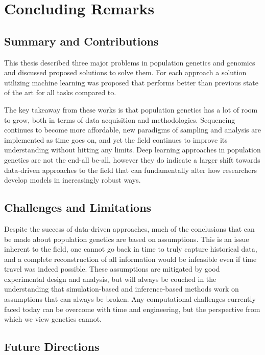 \chapter{Concluding Remarks}

\section{Summary and Contributions}

This thesis described three major problems in population genetics and genomics and discussed proposed solutions to solve them. For each approach a solution utilizing machine learning was proposed that performs better than previous state of the art for all tasks compared to.

The key takeaway from these works is that population genetics has a lot of room to grow, both in terms of data acquisition and methodologies. Sequencing continues to become more affordable, new paradigms of sampling and analysis are implemented as time goes on, and yet the field continues to improve its understanding without hitting any limits. Deep learning approaches in population genetics are not the end-all be-all, however they do indicate a larger shift towards data-driven approaches to the field that can fundamentally alter how researchers develop models in increasingly robust ways.

\section{Challenges and Limitations}

Despite the success of data-driven approaches, much of the conclusions that can be made about population genetics are based on assumptions. This is an issue inherent to the field, one cannot go back in time to truly capture historical data, and a complete reconstruction of all information would be infeasible even if time travel was indeed possible. These assumptions are mitigated by good experimental design and analysis, but will always be couched in the understanding that simulation-based and inference-based methods work on assumptions that can always be broken. Any computational challenges currently faced today can be overcome with time and engineering, but the perspective from which we view genetics cannot.

\section{Future Directions}

